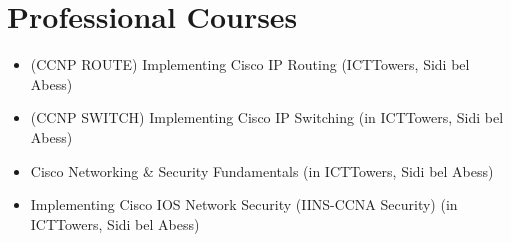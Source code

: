 \documentclass{cv}
\begin{document}
\section{Professional Courses}
\begin{itemize}
  \item (CCNP ROUTE) Implementing Cisco IP Routing (ICTTowers, Sidi bel Abess)
\item (CCNP SWITCH) Implementing Cisco IP Switching  (in ICTTowers, Sidi bel Abess)
\item Cisco Networking \& Security Fundamentals (in ICTTowers, Sidi bel Abess)
\item Implementing Cisco IOS Network Security (IINS-CCNA Security) (in ICTTowers, Sidi bel Abess)
\end{itemize}






\end{document}
